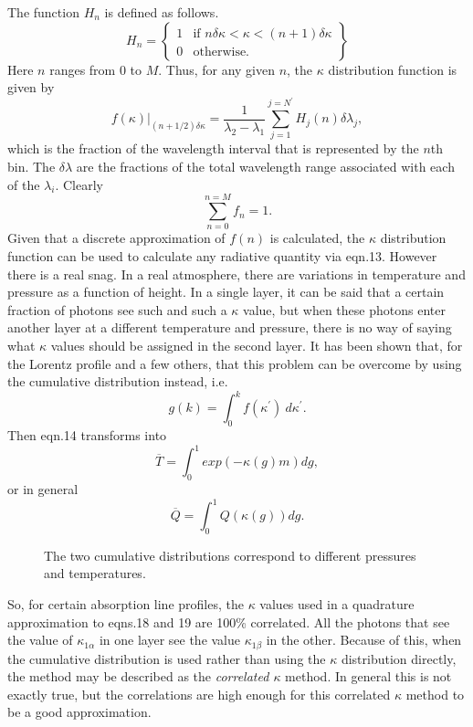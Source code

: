 \documentclass[12pt]{article}
\begin{document}
The function $H_n$ is defined as follows.
\begin{equation}
   H_n=\left \lbrace 
         \begin{array}{ll}
 1 & \mbox{if $n \delta \kappa < \kappa < (n+1) \delta \kappa$}  \\
                0   &  \mbox{otherwise.}  
         \end{array} \right \rbrace
\end{equation}
Here $n$ ranges from 0 to $M$. Thus, for any given $n$, the $\kappa$ distribution 
function is given by
\begin{equation}
f(\kappa)\vert_{(n+1/2)\delta \kappa}=\frac{1}{\lambda_2-\lambda_1} \sum_{j=1}^{j=N^\prime} H_j(n) \delta \lambda_j,
\end{equation}
 which is the fraction of the wavelength interval that is represented by the $n$th bin.
The $\delta \lambda$ are the fractions of the total wavelength range associated 
with each of the $\lambda_i$. Clearly
\begin{equation}
\sum_{n=0}^{n=M} f_n=1.
\end{equation}
Given that a discrete approximation of $f(n)$ is calculated, the $\kappa$ distribution
function can be used to calculate any radiative quantity via eqn.13. However there is
a real snag. In a real atmosphere, there are variations in temperature and pressure
as a function of height. In a single layer, it can be said that a certain fraction
of photons see such and such a $\kappa$ value, but when these photons enter another
layer at a different temperature and pressure, there is no way of saying what $\kappa$
values should be assigned in the second layer. It has been shown that, for the Lorentz
profile and a few others, that this problem can be overcome by using the cumulative
distribution instead, i.e.
\begin{equation}
g(k)=\int_0^k f(\kappa^\prime) \> d \kappa^{\prime}.
\end{equation}
Then eqn.14 transforms into
\begin{equation}
\overline{T} =\int_0^1 exp(-\kappa(g) m) dg, 
\end{equation}
or in general
\begin{equation}
\overline{Q}= \int_0^1 Q(\kappa(g)) dg. 
\end{equation}
\vspace*{11.5cm}
\begin{figure}[htb]
\caption{The two cumulative distributions correspond
to different pressures and temperatures.}  
\end{figure}
So, for certain absorption line profiles, the $\kappa$ values used in a quadrature
approximation to eqns.18 and 19 are 100\% correlated. All the photons that
see the value of $\kappa_{1 \alpha}$ in one layer see the value $\kappa_{1 \beta}$
in the other. Because of this, when the cumulative distribution is used rather than using the $\kappa$ distribution directly, the method may be described as the {\it correlated $\kappa$} method.  In general this is not exactly true, but the correlations
are high enough for this correlated $\kappa$ method to be a good approximation. 
\end{document}
